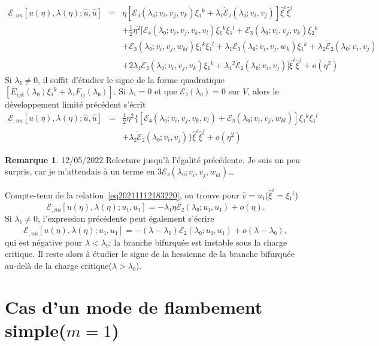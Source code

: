 \documentclass[12pt, final]{amsart}
\theoremstyle{definition}
\newtheorem{remark}{Remarque}
\begin{document}
\begin{eqnarray}
  ℰ_{, u  u} [u(η), λ(η) ; \hat{u}, \hat{u}] &
  = & η [ℰ₃(λ₀ ; v_i, v_j, v_k) ξ₁^k + λ₁
  \dot{ℰ}₂(λ₀ ; v_i, v_j)]  \hat{ξ}^i  \hat{ξ}^j
  \nonumber\\
  &  & + \tfrac{1}{2} η^2  [ℰ₄(λ₀ ; v_i, v_j, v_k, v_l)
  ξ₁^k ξ₁^l +ℰ₃(λ₀ ; v_i, v_j, v_k) ξ₂^k
   \nonumber\\
  &  & +ℰ₃(λ₀ ; v_i, v_j, w_{k  l}) ξ₁^k
  ξ₁^l + λ₁ ℰ₃(λ₀ ; v_i, v_j, w_k) ξ₁^k +
  λ₂  \dot{ℰ}₂(λ₀ ; v_i, v_j) \nonumber\\
  &  &  + 2 λ₁  \dot{ℰ}₃(λ₀ ; v_i, v_j,
  v_k) ξ₁^k + λ₁^2  \ddot{ℰ}₂(λ₀ ; v_i, v_j)]
  \hat{ξ}^i  \hat{ξ}^j + o(η^2) \nonumber
\end{eqnarray}
Si \(λ₁ \neq 0\), il suffit d'étudier le signe de la forme
quadratique \([E_{i  j  k}(λ₀) ξ₁^k + λ₁ F_{i
 j}(λ₀)] .\) Si \(λ₁ = 0\) et que \(ℰ₃
(λ₀) = 0\) sur \(V\), alors le développement limité
précédent s'écrit
\begin{eqnarray}
  ℰ_{, u  u} [u(η), λ(η) ; \hat{u}, \hat{u}] &
  = & \tfrac{1}{2} η^2  \{ [ℰ₄(λ₀ ; v_i, v_j, v_k, v_l)
   +ℰ₃(λ₀ ; v_i, v_j, w_{k  l})] ξ₁^k
  ξ₁^l \nonumber\\
  &  & +  λ₂  \dot{ℰ}₂(λ₀ ; v_i, v_j) \}
  \hat{ξ}^i  \hat{ξ}^j + o(η^2) \nonumber
\end{eqnarray}

\begin{remark}
  12/05/2022 Relecture jusqu'à l'égalité précédente. Je   suis un peu surpris, car je m'attendais à un terme en \(3ℰ₃(λ₀ ; v_i, v_j, w_{k  l})\)\dots
\end{remark}

Compte-tenu de la relation~\eqref{eq20211112183220}, on trouve pour \(\hat{v} = u₁\)(\(\hat{ξ}^i = ξ₁^i\))
\begin{equation}
  ℰ_{, u  u} [u(η), λ(η) ; u₁, u₁] = -
  λ₁ η \dot{ℰ}₂(λ₀ ; u₁, u₁) + o(η) .
\end{equation}
Si \(λ₁ \neq 0\), l'expression précédente peut également s'écrire
\begin{equation}
  ℰ_{, u  u} [u(η), λ(η) ; u₁, u₁] = -
 (λ - λ₀)  \dot{ℰ}₂(λ₀ ; u₁, u₁) + o
 (λ - λ₀),
\end{equation}
qui est négative pour \(λ < λ₀\): la branche bifurquée est instable sous la charge critique. Il reste alors à étudier le signe de la hessienne de la branche bifurquée au-delà de la charge critique(\(λ > λ₀\)).

\section{Cas d'un mode de flambement simple(\(m = 1\))}
\end{document}
